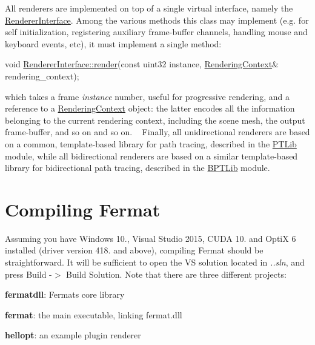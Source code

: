 \begin{DoxyParagraph}{}
All renderers are implemented on top of a single virtual interface, namely the \hyperlink{struct_renderer_interface}{Renderer\+Interface}. Among the various methods this class may implement (e.\+g. for self initialization, registering auxiliary frame-\/buffer channels, handling mouse and keyboard events, etc), it must implement a single method\+: 
\begin{DoxyCode}
\textcolor{keywordtype}{void} \hyperlink{struct_renderer_interface_aa64254dd44c94929b05092dc8d74f29d}{RendererInterface::render}(\textcolor{keyword}{const} uint32 instance, 
      \hyperlink{struct_rendering_context}{RenderingContext}& rendering\_context);
\end{DoxyCode}
 which takes a frame {\itshape instance} number, useful for progressive rendering, and a reference to a \hyperlink{struct_rendering_context}{Rendering\+Context} object\+: the latter encodes all the information belonging to the current rendering context, including the scene mesh, the output frame-\/buffer, and so on and so on. ~\newline
 Finally, all unidirectional renderers are based on a common, template-\/based library for path tracing, described in the \hyperlink{group___p_t_lib}{P\+T\+Lib} module, while all bidirectional renderers are based on a similar template-\/based library for bidirectional path tracing, described in the \hyperlink{group___b_p_t_lib}{B\+P\+T\+Lib} module.
\end{DoxyParagraph}
\hypertarget{index_FermatCompilationSection}{}\section{Compiling Fermat}\label{index_FermatCompilationSection}
\begin{DoxyParagraph}{}
Assuming you have Windows 10., Visual Studio 2015, C\+U\+DA 10. and OptiX 6 installed (driver version 418. and above), compiling Fermat should be straightforward. It will be sufficient to open the VS solution located in {\itshape ..sln}, and press Build -\/$>$ Build Solution. Note that there are three different projects\+:
\begin{DoxyItemize}
\item {\bfseries fermatdll}\+: Fermat\textquotesingle{}s core library
\item {\bfseries fermat}\+: the main executable, linking fermat.\+dll
\item {\bfseries hellopt}\+: an example plugin renderer
\end{DoxyItemize}
\end{DoxyParagraph}
